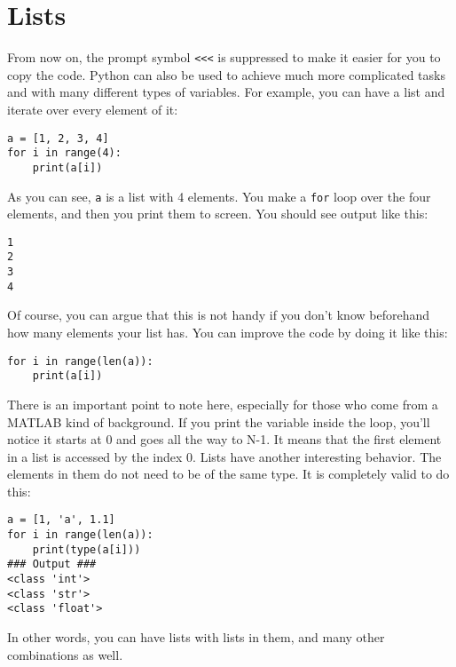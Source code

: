 \section{Lists}\label{sec:lists}
From now on, the prompt symbol \texttt{<<<} is suppressed to make it easier for you to copy the code. Python can also be used to achieve much more complicated tasks and with many different types of variables. For example, you can have a list and iterate over every element of it:

\begin{verbatim}
a = [1, 2, 3, 4]
for i in range(4):
    print(a[i])
\end{verbatim}

As you can see, \texttt{a} is a list with 4 elements. You make a \texttt{for} loop over the four elements, and then you print them to screen. You should see output like this:

\begin{verbatim}
1
2
3
4
\end{verbatim}

Of course, you can argue that this is not handy if you don't know beforehand how many elements your list has. You can improve the code by doing it like this:

\begin{verbatim}
for i in range(len(a)):
    print(a[i])
\end{verbatim}

There is an important point to note here, especially for those who come from a MATLAB kind of background. If you print the variable  inside the loop, you'll notice it starts at 0 and goes all the way to N-1. It means that the first element in a list is accessed by the index 0. Lists have another interesting behavior. The elements in them do not need to be of the same type. It is completely valid to do this:

\begin{verbatim}
a = [1, 'a', 1.1]
for i in range(len(a)):
    print(type(a[i]))
### Output ###
<class 'int'>
<class 'str'>
<class 'float'>
\end{verbatim}

In other words, you can have lists with lists in them, and many other combinations as well.


